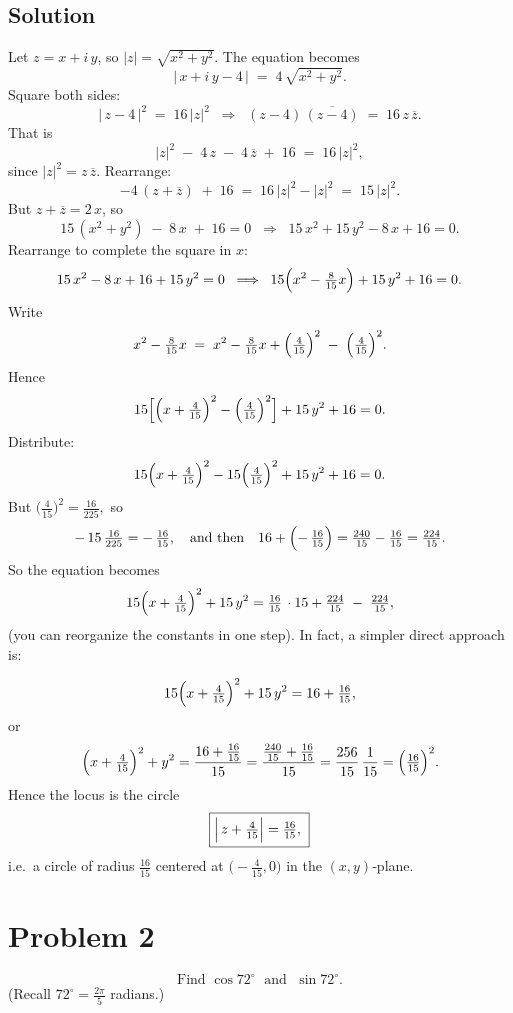 \documentclass[12pt]{article}
\theoremstyle{definition} %
\theoremstyle{plain} %
\begin{document}
\subsection*{Solution}

Let $z = x + i\,y$, so $|z| = \sqrt{x^2 + y^2}.$ The equation becomes
\[
|\,x + i\,y - 4\,| \;=\; 4\,\sqrt{x^2 + y^2}.
\]
Square both sides:
\[
|\,z - 4\,|^2 \;=\; 16\,|z|^2
\;\;\Longrightarrow\;\;
(z-4)\,\overline{(z-4)} \;=\; 16\,z\,\overline{z}.
\]
That is
\[
|z|^2 \;-\; 4\,z \;-\; 4\,\overline{z} \;+\;16 
\;=\; 16\,|z|^2,
\]
since $|z|^2 = z\,\overline{z}.$  Rearrange:
\[
-4\,(z + \overline{z}) \;+\;16 
\;=\; 16\,|z|^2 - |z|^2
\;=\;
15\,|z|^2.
\]
But $z + \overline{z} = 2\,x$, so
\[
15\,(x^2 + y^2) \;-\; 8\,x \;+\;16 = 0
\;\;\Longrightarrow\;\;
15\,x^2 + 15\,y^2 - 8\,x + 16 = 0.
\]
Rearrange to complete the square in $x$:
\[
15\,x^2 - 8\,x + 16 + 15\,y^2 = 0
\;\;\Longrightarrow\;\;
15\Bigl(x^2 - \tfrac{8}{15}x\Bigr) + 15\,y^2 + 16 = 0.
\]
Write
\[
x^2 - \tfrac{8}{15}x 
\;=\;
x^2 - \tfrac{8}{15}x + \Bigl(\tfrac{4}{15}\Bigr)^2 
\;-\;
\Bigl(\tfrac{4}{15}\Bigr)^2.
\]
Hence
\[
15\Bigl[\Bigl(x + \tfrac{4}{15}\Bigr)^2 - \Bigl(\tfrac{4}{15}\Bigr)^2\Bigr] 
+ 15\,y^2 + 16 = 0.
\]
Distribute:
\[
15\Bigl(x + \tfrac{4}{15}\Bigr)^2 - 15\Bigl(\tfrac{4}{15}\Bigr)^2 + 15\,y^2 + 16 = 0.
\]
But $\bigl(\tfrac{4}{15}\bigr)^2 = \tfrac{16}{225},$ so
\[
-\,15\,\tfrac{16}{225} = -\,\tfrac{16}{15}, 
\quad
\text{and then}
\quad
16 + \Bigl(-\,\tfrac{16}{15}\Bigr) = \tfrac{240}{15} - \tfrac{16}{15} = \tfrac{224}{15}.
\]
So the equation becomes
\[
15\Bigl(x + \tfrac{4}{15}\Bigr)^2 + 15\,y^2
= \tfrac{16}{15}\,\cdot 15 + \tfrac{224}{15}
\;-\; \tfrac{224}{15},
\]
(you can reorganize the constants in one step).  In fact, a simpler direct approach is:

\[
15\Bigl(x + \tfrac{4}{15}\Bigr)^2 + 15\,y^2 
= 16 + \tfrac{16}{15},
\]
or
\[
\Bigl(x + \tfrac{4}{15}\Bigr)^2 + y^2
= \frac{16 + \tfrac{16}{15}}{15}
= \frac{\tfrac{240}{15} + \tfrac{16}{15}}{15}
= \frac{256}{15}\,\frac{1}{15}
= \Bigl(\tfrac{16}{15}\Bigr)^2.
\]
Hence the locus is the circle
\[
\boxed{
\Bigl|\,z + \tfrac{4}{15}\Bigr| = \tfrac{16}{15}
,\;}
\]
i.e.\ a circle of radius $\tfrac{16}{15}$ centered at $\bigl(-\tfrac{4}{15},0\bigr)$ in the $(x,y)$‐plane.

\bigskip

\section*{Problem 2}
\[
\text{Find }\cos 72^\circ\;\text{ and }\;\sin 72^\circ.
\]
(Recall $72^\circ = \frac{2\pi}{5}$ radians.)
\end{document}
